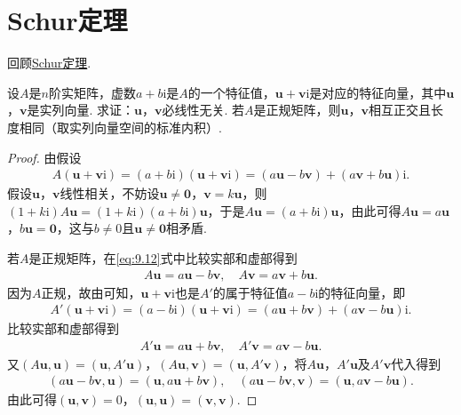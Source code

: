 \documentclass[../../main.tex]{subfiles}%
\begin{document}
\section{Schur定理}

回顾\hyperref[theorem:Schur(舒尔)定理]{Schur定理}.

\begin{proposition}\label{proposition:两个半正定阵可同时合同对角化6}
设\(A\)是\(n\)阶实矩阵，虚数\(a + b\mathrm{i}\)是\(A\)的一个特征值，\(\boldsymbol{u}+ \boldsymbol{v}\mathrm{i}\)是对应的特征向量，其中\(\boldsymbol{u}\)，\(\boldsymbol{v}\)是实列向量. 求证：\(\boldsymbol{u}\)，\(\boldsymbol{v}\)必线性无关. 若\(A\)是正规矩阵，则\(\boldsymbol{u}\)，\(\boldsymbol{v}\)相互正交且长度相同（取实列向量空间的标准内积）.
\end{proposition}
\begin{proof}

由假设
\begin{align}
A(\boldsymbol{u}+ \boldsymbol{v}\mathrm{i})=(a + b\mathrm{i})(\boldsymbol{u}+ \boldsymbol{v}\mathrm{i})=(a\boldsymbol{u}-b\boldsymbol{v})+(a\boldsymbol{v}+b\boldsymbol{u})\mathrm{i}.\label{eq:9.12}
\end{align}
假设\(\boldsymbol{u}\)，\(\boldsymbol{v}\)线性相关，不妨设\(\boldsymbol{u}\neq\boldsymbol{0}\)，\(\boldsymbol{v}=k\boldsymbol{u}\)，则\((1 + k\mathrm{i})A\boldsymbol{u}=(1 + k\mathrm{i})(a + b\mathrm{i})\boldsymbol{u}\)，于是\(A\boldsymbol{u}=(a + b\mathrm{i})\boldsymbol{u}\)，由此可得\(A\boldsymbol{u}=a\boldsymbol{u}\)，\(b\boldsymbol{u}=\boldsymbol{0}\)，这与\(b\neq0\)且\(\boldsymbol{u}\neq\boldsymbol{0}\)相矛盾.

若\(A\)是正规矩阵，在\eqref{eq:9.12}式中比较实部和虚部得到
\begin{align*}
A\boldsymbol{u}=a\boldsymbol{u}-b\boldsymbol{v},\quad A\boldsymbol{v}=a\boldsymbol{v}+b\boldsymbol{u}.
\end{align*}
因为\(A\)正规，故由可知，\(\boldsymbol{u}+ \boldsymbol{v}\mathrm{i}\)也是\(A'\)的属于特征值\(a - b\mathrm{i}\)的特征向量，即
\begin{align*}
A'(\boldsymbol{u}+ \boldsymbol{v}\mathrm{i})=(a - b\mathrm{i})(\boldsymbol{u}+ \boldsymbol{v}\mathrm{i})=(a\boldsymbol{u}+b\boldsymbol{v})+(a\boldsymbol{v}-b\boldsymbol{u})\mathrm{i}.
\end{align*}
比较实部和虚部得到
\begin{align*}
A'\boldsymbol{u}=a\boldsymbol{u}+b\boldsymbol{v},\quad A'\boldsymbol{v}=a\boldsymbol{v}-b\boldsymbol{u}.
\end{align*}
又\((A\boldsymbol{u},\boldsymbol{u})=(\boldsymbol{u},A'\boldsymbol{u})\)，\((A\boldsymbol{u},\boldsymbol{v})=(\boldsymbol{u},A'\boldsymbol{v})\)，将\(A\boldsymbol{u}\)，\(A'\boldsymbol{u}\)及\(A'\boldsymbol{v}\)代入得到
\begin{align*}
(a\boldsymbol{u}-b\boldsymbol{v},\boldsymbol{u})=(\boldsymbol{u},a\boldsymbol{u}+b\boldsymbol{v}),\quad (a\boldsymbol{u}-b\boldsymbol{v},\boldsymbol{v})=(\boldsymbol{u},a\boldsymbol{v}-b\boldsymbol{u}).
\end{align*}
由此可得\((\boldsymbol{u},\boldsymbol{v}) = 0\)，\((\boldsymbol{u},\boldsymbol{u})=(\boldsymbol{v},\boldsymbol{v})\).


\end{proof}
\end{document}
